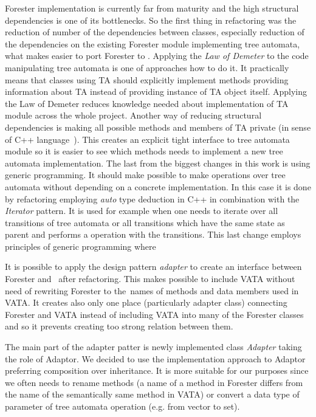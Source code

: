 \documentclass[fleqn,11pt]{ExcelAtFIT} %
\begin{document}
Forester implementation is currently far from maturity and
the high structural dependencies is one of its bottlenecks.
So the first thing in refactoring was the reduction of number of the dependencies between classes,
especially reduction of the dependencies on the existing Forester module implementing tree automata,
what makes easier to port Forester to \vata.
Applying the \emph{Law of Demeter} \cite{lod89} to the code manipulating tree automata is one of approaches how to do it. 
It practically means that classes using TA should explicitly implement methods providing information about TA instead of providing instance of TA object itself.
Applying the Law of Demeter reduces knowledge needed about implementation of TA module across the whole project.
Another way of reducing structural dependencies is making all possible methods and members of TA private (in sense of C++ language~\cite{stroustrup13}).
This creates an explicit tight interface to tree automata module so it is easier to see which methods needs to implement
a new tree automata implementation.
The last from the biggest changes in this work is using generic programming.
It should make possible to make operations over tree automata without depending on a concrete implementation.
In this case it is done by refactoring employing \emph{auto} type deduction in C++ in combination
with the \emph{Iterator} pattern.
It is used for example when one needs to iterate over all transitions of tree automata or all transitions which
have the same state as parent and performs a operation with the transitions.
This last change employs principles of generic programming where

It is possible to apply the design pattern \emph{adapter} \cite{gamma95} to create
an interface between Forester and \vata\ after refactoring.
This makes possible to include VATA without need of rewriting
Forester to the~names of methods and data members used in VATA.
It creates also only one place (particularly adapter class) connecting Forester and VATA instead of
including VATA into many of the Forester classes and so it prevents creating too strong relation between them.

The main part of the adapter patter is newly implemented class \emph{Adapter} taking the role of Adaptor.
We decided to use the implementation approach to Adaptor preferring composition over inheritance.
It is more suitable for our purposes since we often needs to rename methods 
(a name of a method in Forester differs from the name of the semantically same method in VATA)
or convert a data type of parameter of tree automata operation (e.g. from vector to set). 
\end{document}
